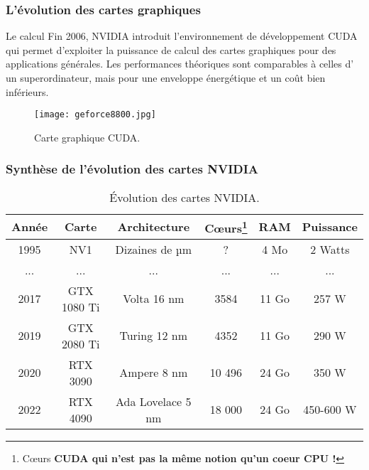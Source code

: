 \begin{frame}
  \frametitle{L'évolution des cartes graphiques}
\begin{block}{Le calcul}
    Fin 2006, NVIDIA introduit l'environnement de développement CUDA qui
    permet d'exploiter la puissance de calcul des cartes graphiques pour des applications générales.
    Les performances théoriques sont comparables à celles d' un 
    superordinateur, mais  pour une enveloppe énergétique et un coût bien inférieurs.

    \begin{figure}[htbp]
        \centering
       \texttt{[image: geforce8800.jpg]} 
        \caption{Carte graphique CUDA.}
        \label{fig:gforce8}
    \end{figure}
\end{block}
\end{frame}

\begin{frame}
  \frametitle{Synthèse de l'évolution des cartes NVIDIA}
\begin{table}
\footnotesize  \centering
            \begin{tabular}{cccccc}
            \rowcolor{lightgray}\textbf{Année} & \textbf{Carte} & \textbf{Architecture} & \textbf{Cœurs\footnote{\tiny Cœurs \bf{CUDA} qui n'est pas la même notion qu'un coeur CPU !}}} & \textbf{RAM} & \textbf{Puissance} \\\hline
            1995 & NV1 & Dizaines de µm & ?  & 4 Mo & 2 Watts \\
            ... & ... & ...  & ... & ... & ...\\
    
            2017 & GTX 1080 Ti & Volta 16 nm & 3584 & 11 Go & 257 W \\
            2019 & GTX 2080 Ti & Turing 12 nm & 4352 & 11 Go & 290 W \\
            2020 & RTX 3090 & Ampere 8 nm & 10 496 & 24 Go & 350 W \\

            2022 & RTX 4090 & Ada Lovelace 5 nm & 18 000  & 24 Go & 450-600 W \\ 
            \end{tabular}
          \caption{Évolution des cartes NVIDIA.}\label{tab:evo_nvidia}
          \end{table}
\end{frame}
